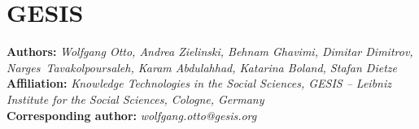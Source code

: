\documentclass[fleqn]{template}
\begin{document}
    \section{GESIS}
    \textbf{Authors:}
    \emph{Wolfgang Otto, Andrea Zielinski,
         Behnam Ghavimi,
         Dimitar Dimitrov,
         Narges~Tavakolpoursaleh,
         Karam Abdulahhad,
         Katarina Boland,
         Stafan Dietze
        }\\
    \textbf{Affiliation:}
    \emph{Knowledge Technologies in the Social Sciences, GESIS -- Leibniz Institute for the Social Sciences, Cologne, Germany}\\
    \textbf{Corresponding author:}
    \emph{wolfgang.otto@gesis.org} %

    
    
    
    
    
    
    
    
    
    
\end{document}
